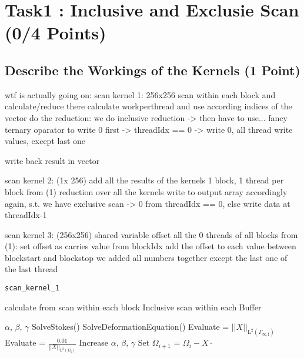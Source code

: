 \section{Task1 : Inclusive and Exclusie Scan (0/4 Points)}
\subsection{Describe the Workings of the Kernels (1 Point)}
wtf is actually going on:
scan kernel 1: 256x256
scan within each block and calculate/reduce there
calculate workperthread and use according indices of the vector
do the reduction:
we do inclusive reduction -> then have to use...
fancy ternary oparator to write 0 first -> threadIdx == 0 -> write 0, all thread write values, except last one
 
write back result in vector
 
scan kernel 2: (1x 256)
add all the results of the kernels
1 block, 1 thread per block from (1)
reduction over all the kernels
write to output array accordingly again, s.t. we have exclusive scan
-> 0 from threadIdx == 0, else write data at threadIdx-1
 
scan kernel 3: (256x256)
shared variable offset
all the 0 threads of all blocks from (1):
set offset as carries value from blockIdx
add the offset to each value between blockstart and blockstop
 we added all numbers together except the last one of the last thread




\begin{algorithm}
	\renewcommand{\thealgorithm}{}
	\caption{\texttt{scan\_kernel\_1}}
	\begin{algorithmic}[1]
    \State calculate  from  
    \State scan within each block 
    \State Inclusive scan within each Buffer
    
    \State 
    
	\State {}
	\State {} $\alpha$, $\beta$, $\gamma$ 
		\State SolveStokes() 
		\State SolveDeformationEquation() 
		\State Evaluate  = $ || X ||_{\mathrm{L}^2(\Gamma_{\infty , \mathrm{i}})} $
		\State Evaluate  = $ \frac{0.01}{|| X ||_{\mathrm{L}^2(\Omega_{\mathrm{i}})}} $
			\State Increase $\alpha$, $\beta$, $\gamma$
			\State {}
		\EndIf
		\EndIf
		\State Set $\Omega_{i+1}$ =  $\Omega_i - X \cdot$  
	\EndFor
	\end{algorithmic}
\end{algorithm}


